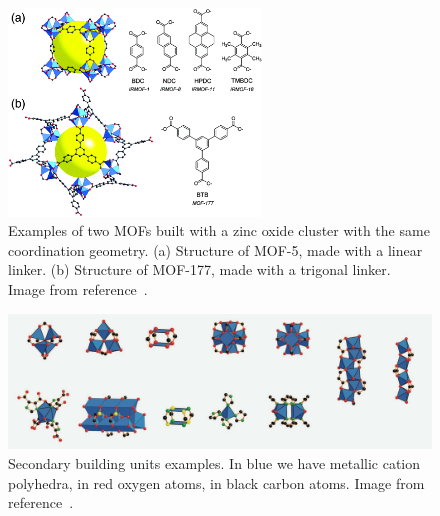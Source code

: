 \documentclass[thesis]{subfiles}
\begin{document}
\begin{figure}[ht]
    \centering
    \includegraphics[width=0.6\textwidth]{figures/images/mof-different-linker}
    \caption{Examples of two MOFs built with a zinc oxide cluster with the same
    coordination geometry. (a) Structure of MOF-5, made with a linear linker.
    (b) Structure of MOF-177, made with a trigonal linker. Image from
    reference~\cite{Rowsell2004}.}
    \label{fig:mof-different-linkers}
\end{figure}

\begin{figure}[ht]
    \centering
    \includegraphics[width=\textwidth]{figures/images/mofs-sbu}
    \caption{Secondary building units examples. In blue we have metallic cation
    polyhedra, in red oxygen atoms, in black carbon atoms. Image from
    reference~\cite{Furukawa2013}.}
    \label{fig:mofs-sbu}
\end{figure}
\end{document}
